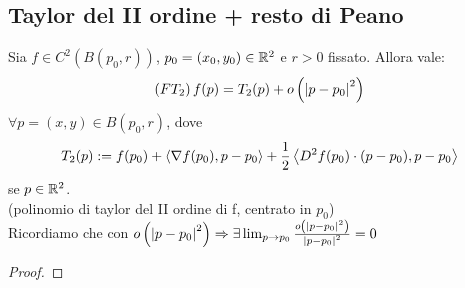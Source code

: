 \subsection{Taylor del II ordine + resto di Peano}
Sia $f \in C^2\left(B(p_0,r)\right)$, $p_0 = (x_0,y_0) \in \mathbb{R}^2$ e $r > 0$ fissato. Allora vale:
$$\left(FT_2\right) f(p) = T_2(p) + o\left(\left\lvert p-p_0 \right\rvert^2\right)$$
$\forall p = (x,y) \in B(p_0,r)$, dove 
$$T_2(p) := f(p_0) + \left\langle \nabla f(p_0), p-p_0 \right\rangle + \frac{1}{2} \left\langle D^2f(p_0) \cdot (p-p_0), p-p_0 \right\rangle$$
se $p \in \mathbb{R}^2$. \\
(polinomio di taylor del II ordine di f, centrato in $p_0$) \\
Ricordiamo che con $o\left(\left\lvert p-p_0 \right\rvert^2\right) \Rightarrow \exists\lim_{p\to p_0} \frac{o\left(\left\lvert p-p_0 \right\rvert^2\right)}{\left\lvert p-p_0 \right\rvert^2} = 0$
\begin{proof}
  
\end{proof} 
